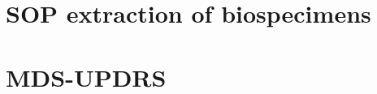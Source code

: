 \section{SOP extraction of biospecimens}
\setcounter{page}{1}

\setcounter{page}{1}


\section{MDS-UPDRS}
\label{sec:mds_updrs}
  
